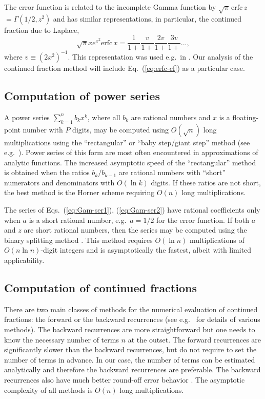 \documentclass{llncs}
\begin{document}
The error function is related to the incomplete Gamma function by
$\sqrt{\pi }\, \textrm{erfc}\, z$$=\Gamma \left(1/2,z^{2}\right)$
and has similar representations, in particular, the continued fraction
due to Laplace,\begin{equation}
\sqrt{\pi }xe^{x^{2}}\textrm{erfc}\, x=\frac{1}{1+}\frac{v}{1+}\frac{2v}{1+}\frac{3v}{1+}...,\label{eq:erfc-cf}\end{equation}
where $v\equiv \left(2x^{2}\right)^{-1}$. This representation was
used e.g.~in \cite{Thacher63}. Our analysis of the continued fraction
method will include Eq.~(\ref{eq:erfc-cf}) as a particular case.


\subsection{Computation of power series}

A power series $\sum _{k=1}^{n}b_{k}x^{k}$, where all $b_{k}$ are
rational numbers and $x$ is a floating-point number with $P$ digits,
may be computed using $O\left(\sqrt{n}\right)$ long multiplications
using the {}``rectangular'' or {}``baby step/giant step'' method
(see e.g.~\cite{Smith89}). Power series of this form are most often
encountered in approximations of analytic functions. The increased
asymptotic speed of the {}``rectangular'' method is obtained when
the ratios $b_{k}/b_{k-1}$ are rational numbers with {}``short''
numerators and denominators with $O\left(\ln k\right)$ digits. If
these ratios are not short, the best method
is the Horner scheme requiring $O\left(n\right)$ long multiplications.

The series of Eqs.~(\ref{eq:Gam-ser1}), (\ref{eq:Gam-ser2}) have
rational coefficients only when $a$ is a short rational number, e.g.~$a=1/2$
for the error function. If both $a$ and $z$ are short rational numbers,
then the series may be computed using the binary splitting method
\cite{HP98}. This method requires $O\left(\ln n\right)$ multiplications
of $O\left(n\ln n\right)$-digit integers and is asymptotically the
fastest, albeit with limited applicability.


\subsection{Computation of continued fractions}

There are two main classes of methods for the numerical evaluation
of continued fractions: the forward or the backward recurrences (see
e.g.~\cite{PTVF92} for details of various methods). The backward
recurrences are more straightforward but one needs to know the necessary
number of terms $n$ at the outset. The forward recurrences are significantly
slower than the backward recurrences, but do not require to set the
number of terms in advance. In our case, the number of terms can be
estimated analytically and therefore the backward recurrences are
preferable. The backward recurrences also have much better round-off
error behavior \cite{JT74}. The asymptotic complexity of all methods
is $O\left(n\right)$ long multiplications.
\end{document}
